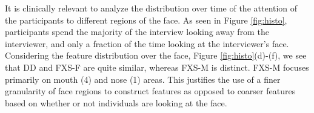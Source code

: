 \documentclass[10pt,twocolumn,letterpaper]{article}
\begin{document}
It is clinically relevant to analyze the distribution over time of the attention of the participants to different regions of the face.  As seen in Figure \ref{fig:histo}, participants spend the majority of the interview looking away from the interviewer, and only a fraction of the time looking at the interviewer's face. Considering the feature distribution over the face, Figure \ref{fig:histo}(d)-(f), we see that DD and FXS-F are quite similar, whereas FXS-M is distinct. FXS-M focuses primarily on mouth (4) and nose (1) areas. This justifies the use of a finer granularity of face regions to construct features as opposed to coarser features based on whether or not individuals are looking at the face.
\begin{figure}%
               \hfill   
               \hfill
               \hfill   
               \hfill
            

\end{figure}
\end{document}
